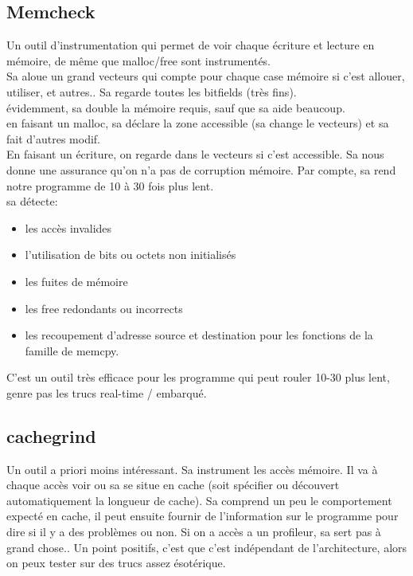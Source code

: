 \documentclass[oneside]{book}
\begin{document}
\subsection{Memcheck}
Un outil d'instrumentation qui permet de voir chaque écriture et lecture en mémoire, de même que malloc/free sont instrumentés. \\

Sa aloue un grand vecteurs qui compte pour chaque case mémoire si c'est allouer, utiliser, et autres.. Sa regarde toutes les bitfields (très fins).\\

évidemment, sa double la mémoire requis, sauf que sa aide beaucoup.\\

en faisant un malloc, sa déclare la zone accessible (sa change le vecteurs) et sa fait d'autres modif.\\

En faisant un écriture, on regarde dans le vecteurs si c'est accessible. Sa nous donne une assurance qu'on n'a pas de corruption mémoire. Par compte, sa rend notre programme de 10 à 30 fois plus lent.\\

sa détecte: 
\begin{itemize}
\item les accès invalides
\item l'utilisation de bits ou octets non initialisés
\item les fuites de mémoire 
\item les free redondants ou incorrects 
\item les recoupement d'adresse source et destination pour les fonctions de la famille de memcpy.
\end{itemize}

C'est un outil très efficace pour les programme qui peut rouler 10-30 plus lent, genre pas les trucs real-time / embarqué.

\subsection{cachegrind}
Un outil a priori moins intéressant. Sa instrument les accès mémoire. Il va à chaque accès voir ou sa se situe en cache (soit spécifier ou découvert automatiquement la longueur de cache). Sa comprend un peu le comportement expecté en cache, il peut ensuite fournir de l'information sur le programme pour dire si il y a des problèmes ou non. Si on a accès a un profileur, sa sert pas à grand chose.. Un point positifs, c'est que c'est indépendant de l'architecture, alors on peux tester sur des trucs assez ésotérique.\\
\end{document}
